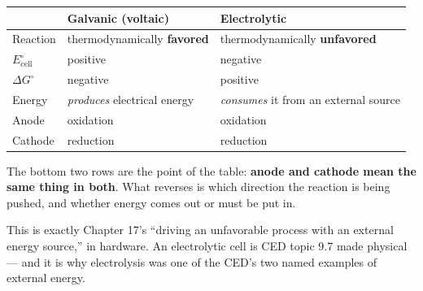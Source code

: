 \documentclass{apchem-notes}
\begin{document}


\begin{center}
\begin{tabular}{@{}lll@{}}
\hline
 & \textbf{Galvanic (voltaic)} & \textbf{Electrolytic} \\
\hline
Reaction & thermodynamically \textbf{favored} & thermodynamically
  \textbf{unfavored} \\
$E^\circ_{\text{cell}}$ & positive & negative \\
$\Delta G^\circ$ & negative & positive \\
Energy & \emph{produces} electrical energy & \emph{consumes} it from an
  external source \\
Anode & oxidation & oxidation \\
Cathode & reduction & reduction \\
\hline
\end{tabular}
\end{center}

The bottom two rows are the point of the table: \textbf{anode and cathode
mean the same thing in both}. What reverses is which direction the reaction
is being pushed, and whether energy comes out or must be put in.

\begin{apctrap}
This is exactly Chapter 17's ``driving an unfavorable process with an
external energy source,'' in hardware. An electrolytic cell is CED topic
9.7 made physical --- and it is why electrolysis was one of the CED's two
named examples of external energy.
\end{apctrap}

\end{document}

